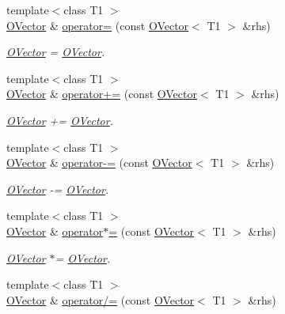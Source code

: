 \begin{DoxyCompactItemize}
{\footnotesize template$<$class T1 $>$ }\\\mbox{\hyperlink{classENSEM_1_1OVector}{O\+Vector}} \& \mbox{\hyperlink{classENSEM_1_1OVector_a7d5f2f5a6c1dc742f53cc4dabc86722e}{operator=}} (const \mbox{\hyperlink{classENSEM_1_1OVector}{O\+Vector}}$<$ T1 $>$ \&rhs)
\begin{DoxyCompactList}\small\item\em \mbox{\hyperlink{classENSEM_1_1OVector}{O\+Vector}} = \mbox{\hyperlink{classENSEM_1_1OVector}{O\+Vector}}. \end{DoxyCompactList}\item 
{\footnotesize template$<$class T1 $>$ }\\\mbox{\hyperlink{classENSEM_1_1OVector}{O\+Vector}} \& \mbox{\hyperlink{classENSEM_1_1OVector_a5ecd1c4c6a2e7d9a6a3e5189b3a22ba5}{operator+=}} (const \mbox{\hyperlink{classENSEM_1_1OVector}{O\+Vector}}$<$ T1 $>$ \&rhs)
\begin{DoxyCompactList}\small\item\em \mbox{\hyperlink{classENSEM_1_1OVector}{O\+Vector}} += \mbox{\hyperlink{classENSEM_1_1OVector}{O\+Vector}}. \end{DoxyCompactList}\item 
{\footnotesize template$<$class T1 $>$ }\\\mbox{\hyperlink{classENSEM_1_1OVector}{O\+Vector}} \& \mbox{\hyperlink{classENSEM_1_1OVector_ae8a6c2f30368c6713325d05065aec425}{operator-\/=}} (const \mbox{\hyperlink{classENSEM_1_1OVector}{O\+Vector}}$<$ T1 $>$ \&rhs)
\begin{DoxyCompactList}\small\item\em \mbox{\hyperlink{classENSEM_1_1OVector}{O\+Vector}} -\/= \mbox{\hyperlink{classENSEM_1_1OVector}{O\+Vector}}. \end{DoxyCompactList}\item 
{\footnotesize template$<$class T1 $>$ }\\\mbox{\hyperlink{classENSEM_1_1OVector}{O\+Vector}} \& \mbox{\hyperlink{classENSEM_1_1OVector_ab1d7773b4a23e20961ece98c90b915b4}{operator$\ast$=}} (const \mbox{\hyperlink{classENSEM_1_1OVector}{O\+Vector}}$<$ T1 $>$ \&rhs)
\begin{DoxyCompactList}\small\item\em \mbox{\hyperlink{classENSEM_1_1OVector}{O\+Vector}} $\ast$= \mbox{\hyperlink{classENSEM_1_1OVector}{O\+Vector}}. \end{DoxyCompactList}\item 
{\footnotesize template$<$class T1 $>$ }\\\mbox{\hyperlink{classENSEM_1_1OVector}{O\+Vector}} \& \mbox{\hyperlink{classENSEM_1_1OVector_a61d1911393adf46629dd493ef09c1022}{operator/=}} (const \mbox{\hyperlink{classENSEM_1_1OVector}{O\+Vector}}$<$ T1 $>$ \&rhs)

\end{DoxyCompactItemize}
